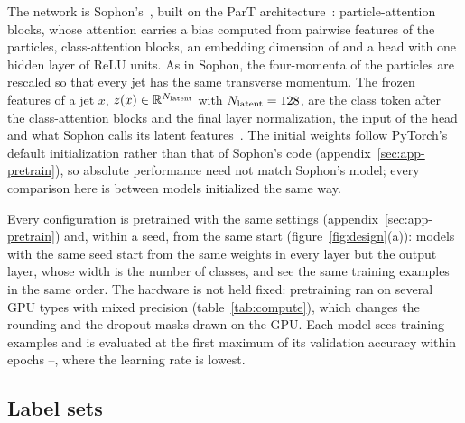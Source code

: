 The network is Sophon's~\cite{sophon,sophoncode}, built on the ParT architecture~\cite{part}: \DesignParticleBlocks{} particle-attention blocks, whose attention carries a bias
computed from pairwise features of the particles, \DesignClassBlocks{} class-attention blocks, an embedding
dimension of \DesignEmbedDim{} and a head with one hidden layer of \DesignHeadHidden{} ReLU units. As in Sophon,
the four-momenta of the particles are rescaled so that every jet has the same transverse momentum. The frozen
features of a jet $x$, $z(x)\in\mathbb{R}^{N_{\mathrm{latent}}}$ with $N_{\mathrm{latent}} = 128$, are the class token after the
class-attention blocks and the final layer normalization, the input of the head and what Sophon calls its latent
features~\cite{sophon}. The initial weights follow PyTorch's default initialization rather than that of
Sophon's code (appendix~\ref{sec:app-pretrain}), so absolute performance need not match Sophon's model; every
comparison here is between models initialized the same way.

Every configuration is pretrained with the same settings (appendix~\ref{sec:app-pretrain}) and, within a seed,
from the same start (figure~\ref{fig:design}(a)): models with the same seed start from the same weights in every
layer but the output layer, whose width is the number of classes, and see the same training examples in the same
order. The hardware is not held fixed: pretraining ran on several GPU types with mixed precision
(table~\ref{tab:compute}), which changes the rounding and the dropout masks drawn on the GPU. Each model sees \DesignExamplesSeen{} training examples and is
evaluated at the first maximum of its validation accuracy within epochs
\DesignWavgFirstEpoch--\DesignWavgLastEpoch, where the learning rate is lowest.

\subsection{Label sets}\label{sec:labelsets}


